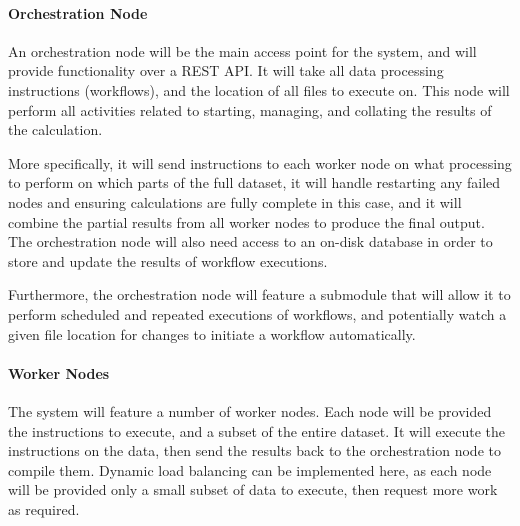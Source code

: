 \documentclass[12pt]{article}
\begin{document}
	\begin{center}
	\end{center}
	
	\paragraph{Orchestration Node}
	An orchestration node will be the main access point for the system, and will provide functionality over a REST API. It will take all data processing instructions (workflows), and the location of all files to execute on. This node will perform all activities related to starting, managing, and collating the results of the calculation. \medskip
	
	More specifically, it will send instructions to each worker node on what processing to perform on which parts of the full dataset, it will handle restarting any failed nodes and ensuring calculations are fully complete in this case, and it will combine the partial results from all worker nodes to produce the final output. The orchestration node will also need access to an on-disk database in order to store and update the results of workflow executions.
	
	Furthermore, the orchestration node will feature a submodule that will allow it to perform scheduled and repeated executions of workflows, and potentially watch a given file location for changes to initiate a workflow automatically.
	
	\paragraph{Worker Nodes}
	The system will feature a number of worker nodes. Each node will be provided the instructions to execute, and a subset of the entire dataset. It will execute the instructions on the data, then send the results back to the orchestration node to compile them. Dynamic load balancing can be implemented here, as each node will be provided only a small subset of data to execute, then request more work as required.
	
\end{document}
